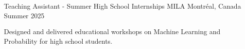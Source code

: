 

\begin{cventries}

    \cventry
    {Teaching Assistant - Summer High School Internships} %
    {MILA} %
    {Montréal, Canada} %
    {Summer 2025} %
    {
      \begin{cvitems} %
        \item {Designed and delivered educational workshops on Machine Learning and Probability for high school students.}
      \end{cvitems}
    }
    

\end{cventries}

